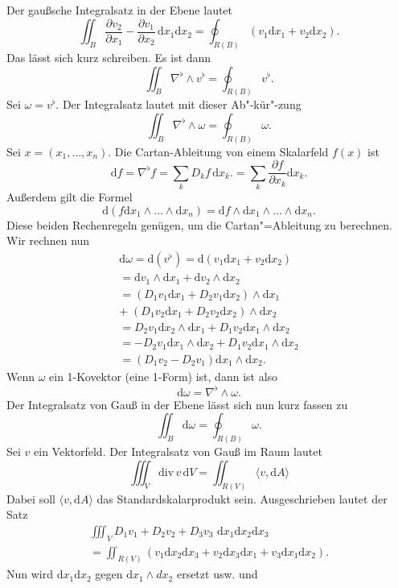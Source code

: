 \documentclass[a4paper,10pt,fleqn,twocolumn,twoside]{article}
\begin{document}
Der gaußsche Integralsatz in der Ebene lautet
\[\iint_B \frac{\partial v_2}{\partial x_1}
- \frac{\partial v_1}{\partial x_2}\,\mathrm dx_1\mathrm dx_2
= \oint_{R(B)} (v_1\mathrm dx_1+v_2\mathrm dx_2).\] 
Das lässt sich kurz schreiben. Es ist dann
\[\iint_B \nabla^\flat\wedge v^\flat = \oint_{R(B)}  v^\flat.\]
Sei \(\omega= v^\flat\).
Der Integralsatz lautet mit dieser Ab"-kür"-zung
\[\iint_B \nabla^\flat\wedge\omega
= \oint_{R(B)} \omega.\]
%
Sei \(x=(x_1,\ldots,x_n)\).
Die Cartan-Ableitung von einem Skalarfeld \(f(x)\) ist
\[\mathrm df = \nabla^\flat f
= \sum_{k} D_k f\,\mathrm dx_k.
= \sum_{k} \frac{\partial f}{\partial x_k}\mathrm dx_k.\]
Außerdem gilt die Formel
\[\mathrm d(f\mathrm dx_1\wedge\ldots\wedge\mathrm dx_n)
= \mathrm df\wedge\mathrm dx_1\wedge\ldots\wedge\mathrm dx_n.\]
Diese beiden Rechenregeln genügen, um die Cartan"=Ableitung
zu berechnen. Wir rechnen nun
\begin{gather*}
\mathrm d\omega
= \mathrm d(v^\flat)
= \mathrm d(v_1\mathrm dx_1+v_2\mathrm dx_2)\\
= \mathrm dv_1\wedge\mathrm dx_1+\mathrm dv_2\wedge\mathrm dx_2\\
= (D_1v_1\mathrm dx_1+D_2v_1\mathrm dx_2)\wedge\mathrm dx_1\\
+\;(D_1v_2\mathrm dx_1+D_2v_2\mathrm dx_2)\wedge\mathrm dx_2\\
= D_2v_1\mathrm dx_2\wedge\mathrm dx_1
+ D_1v_2\mathrm dx_1\wedge\mathrm dx_2\\
= -D_2v_1\mathrm dx_1\wedge\mathrm dx_2
+ D_1v_2\mathrm dx_1\wedge\mathrm dx_2\\
= (D_1v_2-D_2v_1)\mathrm dx_1\wedge\mathrm dx_2.
\end{gather*}
Wenn \(\omega\) ein 1-Kovektor (eine 1-Form) ist, dann ist also
\[\mathrm d\omega
= \nabla^\flat\wedge\omega.\]
Der Integralsatz von Gauß in der Ebene lässt sich nun kurz fassen zu
\[\iint_B \mathrm d\omega
= \oint_{R(B)}\omega.\]
%
Sei \(v\) ein Vektorfeld. Der Integralsatz von Gauß im Raum lautet
\[\iiint_V \mathrm{div}\,v\,\mathrm dV
= \iint_{R(V)} \langle v,\mathrm dA\rangle\]
Dabei soll \(\langle v,\mathrm dA\rangle\) das Standardskalarprodukt
sein. Ausgeschrieben lautet der Satz
\begin{gather*}
\iiint_V D_1v_1+D_2v_2+D_3v_3\,\,\mathrm dx_1\mathrm dx_2\mathrm dx_3\\
= \iint_{R(V)}(v_1\mathrm dx_2\mathrm dx_3+v_2\mathrm dx_3\mathrm dx_1
+v_3 \mathrm dx_1\mathrm dx_2).
\end{gather*}
Nun wird \(\mathrm dx_1\mathrm dx_2\) gegen
\(\mathrm dx_1\wedge dx_2\) ersetzt usw. und
\end{document}
